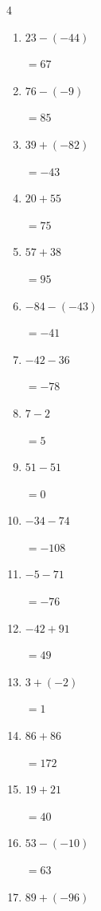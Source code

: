 \begin{multicols}{4}
\begin{enumerate}
        $=-21$

  \item $23-(-44)$

        $=67$

  \item $76-(-9)$

        $=85$

  \item $39+(-82)$

        $=-43$

  \item $20+55$

        $=75$

  \item $57+38$

        $=95$

  \item $-84-(-43)$

        $=-41$

  \item $-42-36$

        $=-78$

  \item $7-2$

        $=5$

  \item $51-51$

        $=0$

  \item $-34-74$

        $=-108$

  \item $-5-71$

        $=-76$

  \item $-42+91$

        $=49$

  \item $3+(-2)$

        $=1$

  \item $86+86$

        $=172$

  \item $19+21$

        $=40$

  \item $53-(-10)$

        $=63$

\columnbreak %

  \item $89+(-96)$


\end{enumerate}
\end{multicols}
